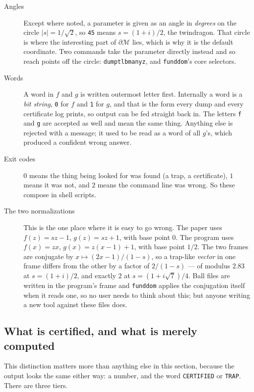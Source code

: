 \documentclass{amsart}
\begin{document}
\begin{description}
\item[Angles] Except where noted, a parameter is given as an angle in \emph{degrees} on the
circle $|s| = 1/\sqrt2$, so \texttt{45} means $s = (1+i)/2$, the twindragon.  That circle is
where the interesting part of $\partial\mathcal{M}$ lies, which is why it is the default
coordinate.  Two commands take the parameter directly instead and so reach points off the
circle: \texttt{dumptlbmanyz}, and \texttt{funddom}'s core selectors.
\item[Words] A word in $f$ and $g$ is written outermost letter first.  Internally a word is a
\emph{bit string}, \texttt{0} for $f$ and \texttt{1} for $g$, and that is the form every dump and
every certificate log prints, so output can be fed straight back in.  The letters \texttt{f} and
\texttt{g} are accepted as well and mean the same thing.  Anything else is rejected with a
message; it used to be read as a word of all $g$'s, which produced a confident wrong answer.
\item[Exit codes] $0$ means the thing being looked for was found (a trap, a certificate), $1$
means it was not, and $2$ means the command line was wrong.  So these compose in shell scripts.
\item[The two normalizations] This is the one place where it is easy to go wrong.
The paper uses $f(z) = sz - 1$, $g(z) = sz + 1$, with base point $0$.  The program uses
$f(x) = zx$, $g(x) = z(x-1) + 1$, with base point $1/2$.  The two frames are conjugate by
$x \mapsto (2x-1)/(1-s)$, so a trap-like \emph{vector} in one frame differs from the other by a
factor of $2/(1-s)$ --- of modulus $2.83$ at $s = (1+i)/2$, and exactly $2$ at
$s = (1 + i\sqrt7)/4$.  Ball files are written in the program's frame and \texttt{funddom}
applies the conjugation itself when it reads one, so no user needs to think about this; but
anyone writing a new tool against these files does.
\end{description}

\subsection{What is certified, and what is merely computed}

This distinction matters more than anything else in this section, because the output looks the
same either way: a number, and the word \texttt{CERTIFIED} or \texttt{TRAP}.  There are three
tiers.
\end{document}
